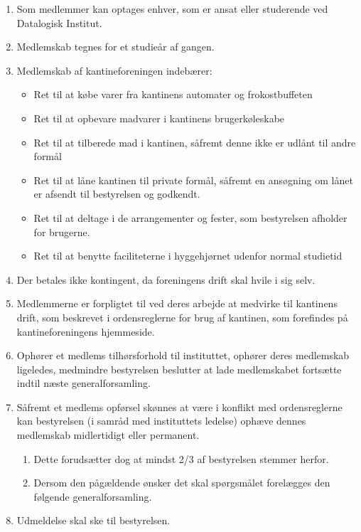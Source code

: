 \documentclass[a4paper, 10pt]{article}
\renewcommand\thesection{\textsection\arabic{section}}
\newenvironment{stykenum}{
  \begin{enumerate}[%
    label=Stk.~\arabic*., ref=\thesection~Stk.~\arabic*, start=1]
}{\end{enumerate}}
\newenvironment{substykenum}{
  \begin{enumerate}[%
          label=Stk.~\arabic{enumi}.\arabic*:,
      ref=\thesection~Stk.~\arabic{enumi}.\arabic*, start=1]
}{\end{enumerate}}
\begin{document}
\begin{stykenum}
\item \label{medlemmer} Som medlemmer kan optages enhver, som er ansat eller
studerende ved Datalogisk Institut.
    \item Medlemskab tegnes for et studieår
af gangen.
    \item Medlemskab af kantineforeningen indebærer:

\medskip

\begin{itemize}

\item Ret til at købe varer fra kantinens automater og frokostbuffeten

\item Ret til at opbevare madvarer i kantinens brugerkøleskabe

\item Ret til at tilberede mad i kantinen, såfremt denne ikke er
udlånt til andre formål

\item Ret til at låne kantinen til private formål, såfremt en
ansøgning om lånet er afsendt til bestyrelsen og godkendt.

\item Ret til at deltage i de arrangementer og fester, som bestyrelsen
afholder for brugerne.

\item Ret til at benytte faciliteterne i hyggehjørnet udenfor normal
studietid

\end{itemize}

\item Der betales ikke kontingent, da foreningens drift skal hvile i sig
selv.

\item Med\-lemmerne er forpligtet til ved deres arbejde at medvirke
til kantinens drift, som beskrevet i ordensreglerne for brug af
kantinen, som forefindes på kantineforeningens hjemmeside.
\item Ophører et medlems tilhørsforhold til instituttet, ophører deres
medlemskab ligeledes, medmindre bestyrelsen beslutter at lade
medlemskabet fortsætte indtil næste generalforsamling.
\item Såfremt et medlems opførsel skønnes at være i konflikt med
ordensreglerne kan bestyrelsen (i samråd med instituttets le\-delse)
ophæve dennes medlemskab midlertidigt eller permanent.
    \begin{substykenum}
    \item Dette
    forudsætter dog at mindst 2/3 af bestyrelsen stemmer herfor.
    \item Dersom
    den pågældende ønsker det skal spørgsmålet forelægges den følgende
    generalforsamling.
    \end{substykenum}
    \item Udmeldelse skal ske til bestyrelsen.
\end{stykenum}
\end{document}

